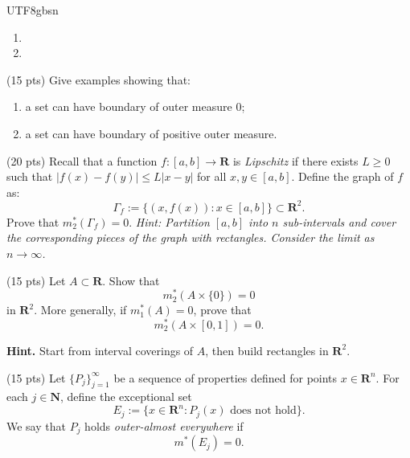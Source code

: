 \documentclass[addpoints]{exam}
\theoremstyle{definition}
\begin{document}
\begin{CJK*}{UTF8}{gbsn}
\begin{questions}
\begin{solution}

\begin{enumerate}
\item[(a)] 



\bigskip
\item[(b)] 




\end{enumerate} 
\end{solution}



\question (15 pts)
Give examples showing that:
\begin{enumerate}
    \item a set can have boundary of outer measure $0$;
    \item a set can have boundary of positive outer measure.
\end{enumerate}

\begin{solution} 

\end{solution}

\question (20 pts) 
Recall that a function $f: [a, b] \to \mathbf{R}$ is \textit{Lipschitz} if there exists $L \geq 0$ such that $|f(x) - f(y)| \leq L|x-y|$ for all $x, y \in [a, b]$. 
Define the graph of $f$ as:
\[
\Gamma_f := \{(x, f(x)) : x \in [a, b]\} \subset \mathbf{R}^2.
\]
Prove that $m^*_2(\Gamma_f) = 0$. 
\textit{Hint: Partition $[a, b]$ into $n$ sub-intervals and cover the corresponding pieces of the graph with rectangles. Consider the limit as $n \to \infty$.}

\begin{solution} 
 
 \end{solution}
 
\question (15 pts) Let $A\subset \mathbf{R}$. Show that
\[
m_2^*(A\times\{0\})=0
\]
in $\mathbf{R}^2$.
More generally, if $m_1^*(A)=0$, prove that
\[
m_2^*(A\times[0,1])=0.
\]

\medskip
\noindent\textbf{Hint.}
Start from interval coverings of $A$, then build rectangles in $\mathbf{R}^2$.
\begin{solution} 

\end{solution}

\question (15 pts) Let $\{P_j\}_{j=1}^\infty$ be a sequence of properties defined for points $x\in \mathbf{R}^n$. For each $j\in \mathbf{N}$, define the exceptional set
\[
E_j:=\{x\in \mathbf{R}^n : P_j(x)\text{ does not hold}\}.
\]
We say that $P_j$ holds \emph{outer-almost everywhere} if
\[
m^*(E_j)=0.
\]


\end{questions}
\end{CJK*}
\end{document}
